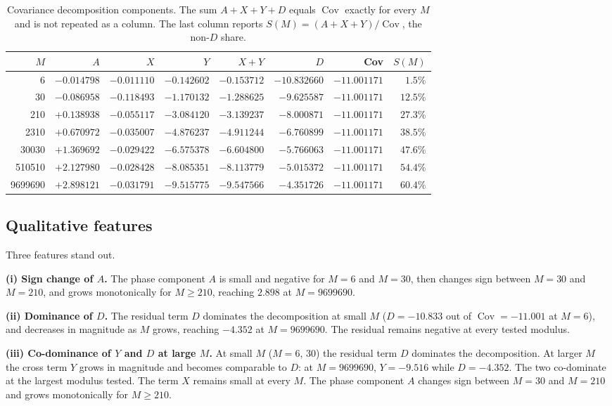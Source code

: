 \begin{table}[ht]
\centering
\caption{Covariance decomposition components. The sum
$A+X+Y+D$ equals $\operatorname{Cov}$ exactly for every $M$
and is not repeated as a column. The last column reports
$S(M) = (A+X+Y)/\operatorname{Cov}$, the non-$D$ share.}
\label{tab:abcd}
\small
\begin{tabular}{rrrrrrrr}
\toprule
$M$  &  $A$  &  $X$  &  $Y$  &  $X+Y$  &  $D$  &  Cov  &  $S(M)$  \\
\midrule
6 & $-0.014798$ & $-0.011110$ & $-0.142602$ & $-0.153712$ & $-10.832660$ & $-11.001171$ & $1.5\%$ \\
30 & $-0.086958$ & $-0.118493$ & $-1.170132$ & $-1.288625$ & $-9.625587$ & $-11.001171$ & $12.5\%$ \\
210 & $+0.138938$ & $-0.055117$ & $-3.084120$ & $-3.139237$ & $-8.000871$ & $-11.001171$ & $27.3\%$ \\
2310 & $+0.670972$ & $-0.035007$ & $-4.876237$ & $-4.911244$ & $-6.760899$ & $-11.001171$ & $38.5\%$ \\
30030 & $+1.369692$ & $-0.029422$ & $-6.575378$ & $-6.604800$ & $-5.766063$ & $-11.001171$ & $47.6\%$ \\
510510 & $+2.127980$ & $-0.028428$ & $-8.085351$ & $-8.113779$ & $-5.015372$ & $-11.001171$ & $54.4\%$ \\
9699690 & $+2.898121$ & $-0.031791$ & $-9.515775$ & $-9.547566$ & $-4.351726$ & $-11.001171$ & $60.4\%$ \\
\bottomrule
\end{tabular}
\end{table}

\subsection{Qualitative features}

Three features stand out.

\textbf{(i) Sign change of $A$.} The phase component $A$ is small and negative for $M=6$ and $M=30$, then changes sign between $M=30$ and $M=210$, and grows monotonically for $M\ge 210$, reaching $2.898$ at $M=9699690$.

\textbf{(ii) Dominance of $D$.} The residual term $D$ dominates the decomposition at small $M$ ($D=-10.833$ out of $\operatorname{Cov}=-11.001$ at $M=6$), and decreases in magnitude as $M$ grows, reaching $-4.352$ at $M=9699690$. The residual remains negative at every tested modulus.

\textbf{(iii) Co-dominance of $Y$ and $D$ at large $M$.} At small $M$ ($M=6$, $30$) the residual term $D$ dominates the decomposition. At larger $M$ the cross term $Y$ grows in magnitude and becomes comparable to $D$: at $M=9699690$, $Y = -9.516$ while $D = -4.352$. The two co-dominate at the largest modulus tested. The term $X$ remains small at every $M$. The phase component $A$ changes sign between $M=30$ and $M=210$ and grows monotonically for $M\ge 210$.

